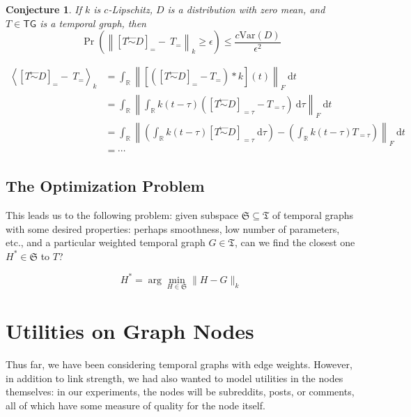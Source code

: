 \documentclass{article}
\newtheorem{conj}{Conjecture}
\theoremstyle{definition}
\newcommand{\noised}[2]{\left[#1 \stackrel{\gets}{\sim } #2\right]}
\begin{document}
	\begin{conj}
		If $k$ is $c$-Lipschitz, $D$ is a distribution with zero mean, and $T \in \mathsf{TG}$ is a temporal graph, then 
		\[ \Pr \left(\left\lVert \noised T {D} _= -~T_= \right\rVert_k \geq \epsilon \right)\leq \frac{c \mathrm{Var}(D)}{\epsilon^2} \]
	\end{conj}
	\begin{center}
		\begin{align*}
			\left\langle \noised T {D} _= -~T_= \right\rangle_k
				 &= \int_{\mathbb R} \left\lVert \left[\left( \noised T {D} _= - T_=\right) * k\right] (t) \right \rVert_F ~\mathrm d t \\
				 &= \int_{\mathbb R} \left\lVert \int_{\mathbb R} k(t - \tau)\left( \noised T {D} _{=\tau} - T_{=\tau}\right)~\mathrm d \tau \right \rVert_F ~\mathrm d t\\
				 &= \int_{\mathbb R} \left\lVert \left(\int_{\mathbb R} k(t - \tau) \noised T {D} _{=\tau} ~\mathrm d \tau\right) - 
				 \left( \int_{\mathbb R} k(t - \tau)  T_{=\tau}\right) \right \rVert_F ~\mathrm d t\\
				 &= \cdots
		\end{align*}
	\end{center}
	
	\subsection{The Optimization Problem}
	
	This leads us to the following problem: given subspace $\mathfrak S \subseteq \mathfrak T$ of temporal graphs with some desired properties: perhaps smoothness, low number of parameters, etc., and a particular weighted temporal graph $G \in \mathfrak T$, can we find the closest one $H^* \in \mathfrak S$ to $T$?
	
	\[ H^* = \arg\min_{H \in \mathfrak S} \Big\lVert H  - G \Big\rVert_k \]
	
	
	\section{Utilities on Graph Nodes}
	Thus far, we have been considering temporal graphs with edge weights. However, in addition to link strength, we had also wanted to model utilities in the nodes themselves: in our experiments, the nodes will be subreddits, posts, or comments, all of which have some measure of quality for the node itself.
	
	
\end{document}
